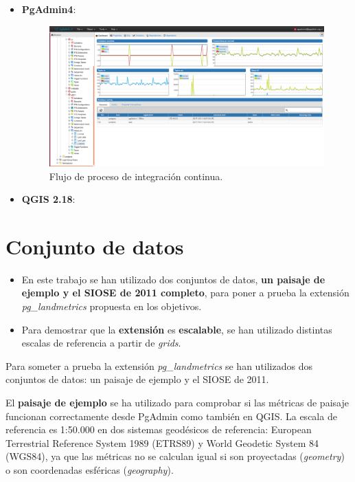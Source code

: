 \begin{itemize}
\item\textbf{PgAdmin4}: 

\begin{figure}
\begin{center}
\includegraphics[width=\textwidth]{Metodologia/Figs/carga-siose-2011.png}
\caption{Flujo de proceso de integración continua. \label{fig:carga}}
\end{center}
\end{figure}

\item\textbf{QGIS 2.18}: 
\end{itemize}

\section{Conjunto de datos}

\begin{graybox}
\begin{itemize}
\item En este trabajo se han utilizado dos conjuntos de datos, \textbf{un paisaje de ejemplo y el SIOSE de 2011 completo}, para poner a prueba la extensión \textit{pg\_landmetrics} propuesta en los objetivos.
\item Para demostrar que la \textbf{extensión} es \textbf{escalable}, se han utilizado distintas escalas de referencia a partir de \textit{grids}.
\end{itemize}
\end{graybox}

Para someter a prueba la extensión \textit{pg\_landmetrics} se han utilizados dos conjuntos de datos: un paisaje de ejemplo y el SIOSE de 2011.

El \textbf{paisaje de ejemplo} se ha utilizado para comprobar si las métricas de paisaje funcionan correctamente desde PgAdmin como también en QGIS. La escala de referencia es 1:50.000 en dos sistemas geodésicos de referencia: European Terrestrial Reference System 1989 (ETRS89) y World Geodetic System 84 (WGS84), ya que las métricas no se calculan igual si son proyectadas (\textit{geometry}) o son coordenadas esféricas (\textit{geography}). 

